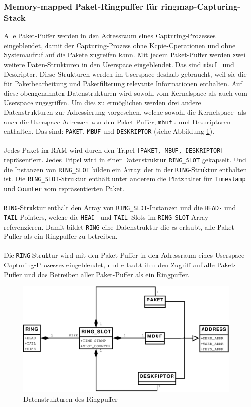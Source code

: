 \subsubsection{Memory-mapped Paket-Ringpuffer für ringmap-Capturing-Stack}\label{sec:memmap_pr}
Alle Paket-Puffer werden in den Adressraum eines Capturing-Prozesses
eingeblendet, damit der Capturing-Prozess ohne Kopie-Operationen und ohne
Systemaufruf auf die Pakete zugreifen kann. Mit jedem Paket-Puffer werden zwei
weitere Daten-Strukturen in den Userspace eingeblendet. Das sind
\verb+mbuf+~\cite{man_bpf} und Deskriptor.  Diese Strukturen werden im Userspace
deshalb gebraucht, weil sie die für Paketbearbeitung und Paketfilterung
relevante Informationen enthalten.  Auf diese obengenannten Datenstrukturen
wird sowohl vom Kernelspace als auch vom Userspace zugegriffen.  Um dies zu
ermöglichen werden drei andere Datenstrukturen zur Adressierung vorgesehen, 
welche sowohl die Kernelspace- als auch die Userspace-Adressen von den 
Paket-Puffer, \verb+mbuf+'s und Deskriptoren enthalten.
Das sind: \verb+PAKET+, \verb+MBUF+ und  \verb+DESKRIPTOR+ (siehe Abbildung
\ref{img:uml_ring}).\\\\
%
Jedes Paket im RAM wird durch den Tripel \verb+[PAKET, MBUF, DESKRIPTOR]+
repräsentiert. Jedes Tripel wird in einer Datenstruktur \verb+RING_SLOT+
gekapselt.  Und die Instanzen von \verb+RING_SLOT+ bilden ein Array,
der in der \verb+RING+-Struktur enthalten ist.  Die \verb+RING_SLOT+-Struktur
enthält unter anderem die Platzhalter für \verb+Timestamp+ und \verb+Counter+
vom repräsentierten Paket.\\\\
%
\verb+RING+-Struktur enthält den Array von \verb+RING_SLOT+-Instanzen und die
\verb+HEAD-+ und \verb+TAIL+-Pointers, welche die \verb+HEAD-+ und
\verb+TAIL-+Slots im \verb+RING_SLOT+-Array referenzieren. Damit bildet
\verb+RING+ eine Datenstruktur die es erlaubt, alle  Paket-Puffer als ein
Ringpuffer zu betreiben.\\\\
%
Die \verb+RING+-Struktur wird mit den Paket-Puffer in den Adressraum eines
Userspace-Capturing-Prozesses eingeblendet, und erlaubt ihm den Zugriff auf alle
Paket-Puffer und das Betreiben aller Paket-Puffer als ein Ringpuffer.
%
\begin{figure}
\centering \includegraphics[width=6.4in]{bilder/uml_RING_Puffer}
\caption{Datenstrukturen des Ringpuffer}
\label{img:uml_ring}
\end{figure}

